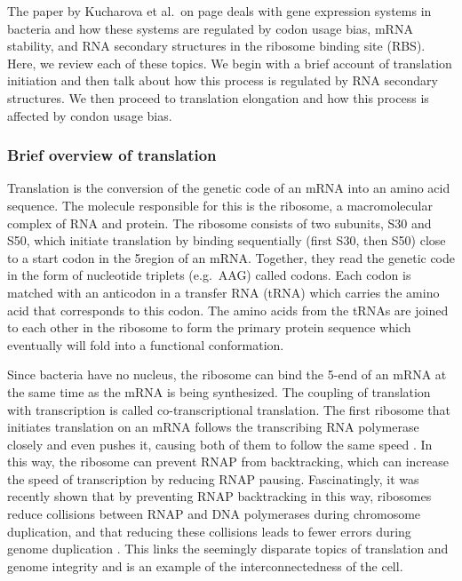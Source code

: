%
The paper by Kucharova et al.\ on page \pageref{vero_paper} deals with gene
expression systems in bacteria and how these systems are regulated by codon
usage bias, mRNA stability, and RNA secondary structures in the ribosome
binding site (RBS). Here, we review each of these topics. We begin with a brief
account of translation initiation and then talk about how this process is
regulated by RNA secondary structures. We then proceed to translation
elongation and how this process is affected by condon usage bias.

\subsubsection{Brief overview of translation}
Translation is the conversion of the genetic code of an mRNA into an amino acid
sequence. The molecule responsible for this is the ribosome, a macromolecular
complex of RNA and protein. The ribosome consists of two subunits, S30 and S50,
which initiate translation by binding sequentially (first S30, then S50) close
to a start codon in the 5\ppp region of an mRNA.  Together, they read the
genetic code in the form of nucleotide triplets (e.g.\ AAG) called codons. Each
codon is matched with an anticodon in a transfer RNA (tRNA) which carries the
amino acid that corresponds to this codon. The amino acids from the tRNAs are
joined to each other in the ribosome to form the primary protein sequence which
eventually will fold into a functional conformation.

Since bacteria have no nucleus, the ribosome can bind the 5\ppp-end of an mRNA
at the same time as the mRNA is being synthesized. The coupling of translation
with transcription is called co-transcriptional translation. The first ribosome
that initiates translation on an mRNA follows the transcribing RNA polymerase
closely and even pushes it, causing both of them to follow the same speed
\cite{proshkin_cooperation_2010}. In this way, the ribosome can prevent RNAP
from backtracking, which can increase the speed of transcription by reducing
RNAP pausing. Fascinatingly, it was recently shown that by preventing RNAP
backtracking in this way, ribosomes reduce collisions between RNAP and DNA
polymerases during chromosome duplication, and that reducing these collisions
leads to fewer errors during genome duplication \cite{dutta_linking_2011}. This
links the seemingly disparate topics of translation and genome integrity and is
an example of the interconnectedness of the cell.

